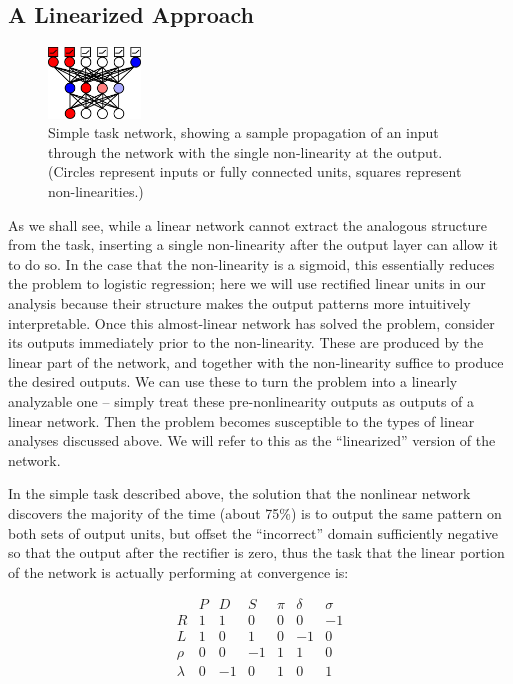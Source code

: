 \documentclass[10pt,letterpaper]{article}
\begin{document}
\subsection{A Linearized Approach}
\begin{figure}[p]
\centering
\includegraphics[width=0.22\textwidth]{figures/network_diagram.png}
\caption{Simple task network, showing a sample propagation of an input through the network with the single non-linearity at the output. (Circles represent inputs or fully connected units, squares represent non-linearities.) }
\label{network_diagram}
\end{figure}
As we shall see, while a linear network cannot extract the analogous structure from the task, inserting a single non-linearity after the output layer can allow it to do so. In the case that the non-linearity is a sigmoid, this essentially reduces the problem to logistic regression; here we will use rectified linear units in our analysis because their structure makes the output patterns more intuitively interpretable. Once this almost-linear network has solved the problem, consider its outputs immediately prior to the non-linearity. These are produced by the linear part of the network, and together with the non-linearity suffice to produce the desired outputs. We can use these to turn the problem into a linearly analyzable one -- simply treat these pre-nonlinearity outputs as outputs of a linear network. Then the problem becomes susceptible to the types of linear analyses discussed above. We will refer to this as the ``linearized'' version of the network. \par 
In the simple task described above, the solution that the nonlinear network discovers the majority of the time (about 75\%) is to output the same pattern on both sets of output units, but offset the ``incorrect'' domain sufficiently negative so that the output after the rectifier is zero, thus the task that the linear portion of the network is actually performing at convergence is: \par
\vspace{-1em}
{ 
\[
\begin{array}{c|cccccc} 
& P & D & S & \pi & \delta & \sigma \\
\hline
R & 1 & 1 & 0 & 0 & 0 & -1 \\
L & 1 & 0 & 1 & 0 & -1 & 0 \\
\rho & 0 & 0 & -1 & 1 & 1 & 0\\
\lambda & 0 & -1 & 0 & 1 & 0 & 1\\
\end{array} 
\]
}
\end{document}
